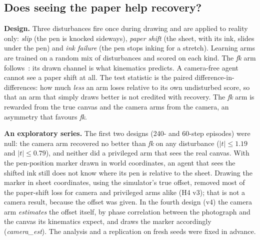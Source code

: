 \documentclass[conference]{IEEEtran}
\begin{document}
\subsection{Does seeing the paper help recovery?}
\label{sec:h4}
\textbf{Design.} Three disturbances fire once during drawing and are applied to reality
only: \emph{slip} (the pen is knocked sideways), \emph{paper shift} (the sheet, with its
ink, slides under the pen) and \emph{ink failure} (the pen stops inking for a stretch).
Learning arms are trained on a random mix of disturbances and scored on each kind. The
\emph{fk} arm follows~\cite{D01}: its drawn channel is what kinematics predicts. A
camera-free agent cannot see a paper shift at all. The test statistic is the paired
difference-in-differences: how much \emph{less} an arm loses relative to its own
undisturbed score, so that an arm that simply draws better is not credited with recovery.
The \emph{fk} arm is rewarded from the true canvas and the camera arms from the camera,
an asymmetry that favours \emph{fk}.

\textbf{An exploratory series.} The first two designs (240- and 60-step episodes) were null:
the camera arm recovered no better than \emph{fk} on any disturbance ($|t| \le 1.19$ and %
$|t| \le 0.79$), and neither did a privileged arm that sees the real canvas. With the %
pen-position marker drawn in world coordinates, an agent that sees the shifted ink still
does not know where its pen is relative to the sheet. Drawing the marker in sheet
coordinates, using the simulator's true offset, removed most of the paper-shift loss for
camera and privileged arms alike (H4 v3); that is not a camera result, because the offset
was given. In the fourth design (v4) the camera arm \emph{estimates} the offset itself, by
phase correlation between the photograph and the canvas its kinematics expect, and draws
the marker accordingly (\emph{camera\_est}). The analysis and a replication on fresh seeds
were fixed in advance.
\end{document}

